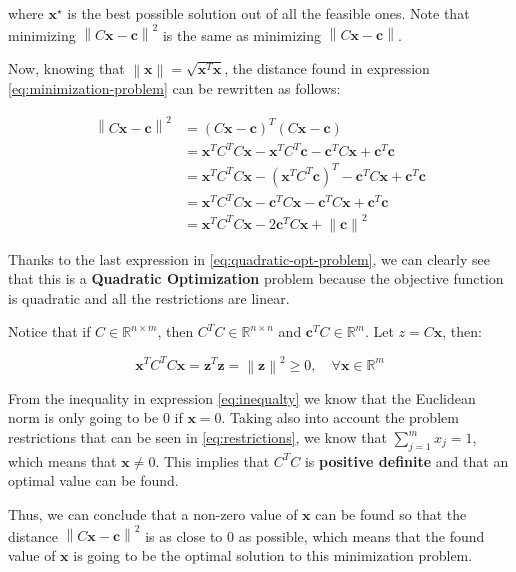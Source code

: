 \documentclass[11pt,a4paper]{article}
\newcommand{\norm}[1]{\left\lVert#1\right\rVert}
\newcommand{\algebraVector}[1]{\boldsymbol{#1}}
\begin{document}
\noindent where $\algebraVector{x}^\star$ is the best possible solution out of all the
feasible ones. Note that minimizing $\norm{C\algebraVector{x} - \algebraVector{c}}^2$
is the same as minimizing $\norm{C\algebraVector{x} - \algebraVector{c}}$.

Now, knowing that $\norm{\algebraVector{x}} = \sqrt{\algebraVector{x}^T\algebraVector{x}}$, the
distance found in expression \eqref{eq:minimization-problem} can be rewritten as follows:

\begin{equation}
  \label{eq:quadratic-opt-problem}
\begin{aligned}
  \norm{C\algebraVector{x} - \algebraVector{c}}^2 &=
  (C\algebraVector{x} - \algebraVector{c})^T (C\algebraVector{x} - \algebraVector{c})\\
  &= \algebraVector{x}^T C^T C \algebraVector{x} - \algebraVector{x}^T C^T \algebraVector{c} - \algebraVector{c}^T C \algebraVector{x} + \algebraVector{c}^T \algebraVector{c} \\
  & = \algebraVector{x}^T C^T C \algebraVector{x} - (\algebraVector{x}^T C^T \algebraVector{c})^T - \algebraVector{c}^T C \algebraVector{x} + \algebraVector{c}^T \algebraVector{c} \\
  & = \algebraVector{x}^T C^T C \algebraVector{x} - \algebraVector{c}^T C \algebraVector{x} - \algebraVector{c}^T C \algebraVector{x} + \algebraVector{c}^T \algebraVector{c} \\
  & = \algebraVector{x}^T C^T C \algebraVector{x} - 2\algebraVector{c}^T C \algebraVector{x} + \norm{\algebraVector{c}}^2
\end{aligned}
\end{equation}

Thanks to the last expression in \eqref{eq:quadratic-opt-problem}, we can clearly see that
this is a \textbf{Quadratic Optimization} problem because the objective function is quadratic and
all the restrictions are linear.

Notice that if $C \in \mathbb{R}^{n \times m}$, then $C^T C \in \mathbb{R}^{n \times n}$
and $\algebraVector{c}^T C \in \mathbb{R}^m$. Let $z = C \algebraVector{x}$, then:

\begin{equation}
  \label{eq:inequalty}
  \algebraVector{x}^T C^T C \algebraVector{x} = \algebraVector{z}^T \algebraVector{z} = \norm{\algebraVector{z}}^2 \geq 0,
  \quad \forall \algebraVector{x} \in \mathbb{R}^m
\end{equation}

From the inequality in expression \eqref{eq:inequalty} we know that the Euclidean norm
is only going to be 0 if $\algebraVector{x} = 0$. Taking also into account the problem restrictions
that can be seen in \eqref{eq:restrictions}, we know that $\sum_{j=1}^m x_j = 1$, which means that
$\algebraVector{x} \neq 0$. This implies that $C^T C$ is \textbf{positive definite} and that
an optimal value can be found.

Thus, we can conclude that a non-zero value of $\algebraVector{x}$ can be found so that
the distance $\norm{C\algebraVector{x} - \algebraVector{c}}^2$ is as close to 0 as possible, which
means that the found value of $\algebraVector{x}$ is going to be the optimal solution to this
minimization problem.
\end{document}
